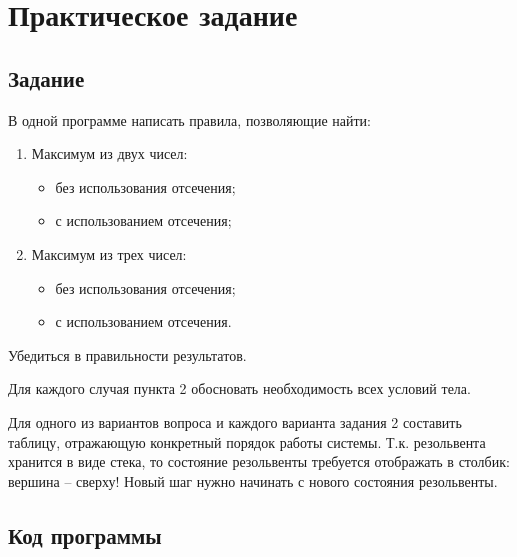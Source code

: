 \documentclass[14pt,a4paper]{scrreprt}
\begin{document}


\thispagestyle{empty}

\chapter{Практическое задание}

\section{Задание}

В одной программе написать правила, позволяющие найти:
\begin{enumerate}
	\item Максимум из двух чисел:
	\begin{itemize}
		\item без использования отсечения;
		\item с использованием отсечения;
	\end{itemize}
	\item Максимум из трех чисел:
	\begin{itemize}
		\item без использования отсечения;
		\item с использованием отсечения.
	\end{itemize}
\end{enumerate}
Убедиться в правильности результатов.

Для каждого случая пункта 2 обосновать необходимость всех условий тела. 

Для одного из вариантов вопроса и каждого варианта задания 2 составить таблицу, отражающую конкретный порядок работы системы. Т.к. резольвента хранится в виде стека, то состояние резольвенты требуется отображать в столбик: вершина -- сверху! Новый шаг нужно начинать с нового состояния резольвенты. 

\section{Код программы}
\end{document}
